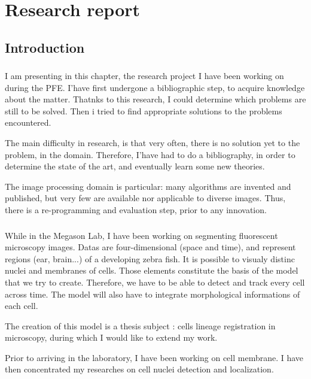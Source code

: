 

\chapter{Research report} 

\section*{Introduction}

\subsection*{}
I am presenting in this chapter, the research project I have been working on during the PFE. I'have first undergone a bibliographic step, to acquire knowledge about the matter. Thatnks to this research, I could determine which problems are still to be solved. Then i tried to find appropriate solutions to the problems encountered.

The main difficulty in research, is that very often, there is no solution yet to the problem, in the domain. Therefore, I'have had to do a bibliography, in order to determine the state of the art, and eventually learn some new theories.

The image processing domain is particular: many algorithms are invented and published, but very few are available nor applicable to diverse images.
Thus, there is a re-programming and evaluation step, prior to any innovation.

\subsection*{}

While in the Megason Lab, I have been working on segmenting fluorescent microscopy images.
Datas are four-dimensional (space and time), and represent regions (ear, brain...) of a developing zebra fish.
It is possible to visualy distinc nuclei and membranes of cells. Those elements constitute the basis of the model that we try to create.
Therefore, we have to be able to detect and track every cell across time. The model will also have to integrate morphological informations of each cell.

The creation of this model is a thesis subject : cells lineage registration in microscopy, during which I would like to extend my work.

Prior to arriving in the laboratory, I have been working on cell membrane. I have then concentrated my researches on cell nuclei detection and localization.




